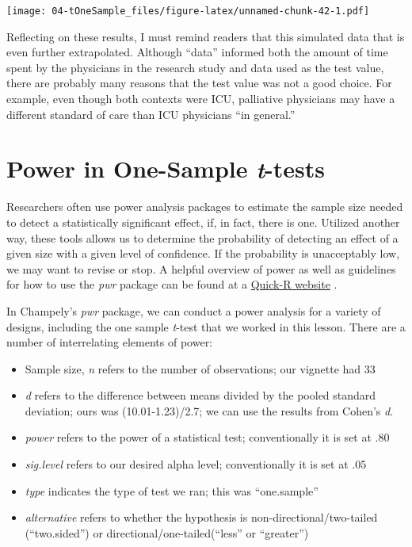 \documentclass[
  11pt,
]{book}
\providecommand{\tightlist}{%
  \setlength{\itemsep}{0pt}\setlength{\parskip}{0pt}}
\begin{document}
\texttt{[image: 04-tOneSample\_files/figure-latex/unnamed-chunk-42-1.pdf]}

Reflecting on these results, I must remind readers that this simulated data that is even further extrapolated. Although ``data'' informed both the amount of time spent by the physicians in the research study and data used as the test value, there are probably many reasons that the test value was not a good choice. For example, even though both contexts were ICU, palliative physicians may have a different standard of care than ICU physicians ``in general.''

\hypertarget{power-in-one-sample-t-tests}{%
\section{\texorpdfstring{Power in One-Sample \emph{t}-tests}{Power in One-Sample t-tests}}\label{power-in-one-sample-t-tests}}

Researchers often use power analysis packages to estimate the sample size needed to detect a statistically significant effect, if, in fact, there is one. Utilized another way, these tools allows us to determine the probability of detecting an effect of a given size with a given level of confidence. If the probability is unacceptably low, we may want to revise or stop. A helpful overview of power as well as guidelines for how to use the \emph{pwr} package can be found at a \href{https://www.statmethods.net/stats/power.html}{Quick-R website} \citep{kabacoff_power_2017}.

In Champely's \emph{pwr} package, we can conduct a power analysis for a variety of designs, including the one sample \emph{t}-test that we worked in this lesson. There are a number of interrelating elements of power:

\begin{itemize}
\tightlist
\item
  Sample size, \emph{n} refers to the number of observations; our vignette had 33
\item
  \emph{d} refers to the difference between means divided by the pooled standard deviation; ours was (10.01-1.23)/2.7; we can use the results from Cohen's \emph{d}.
\item
  \emph{power} refers to the power of a statistical test; conventionally it is set at .80
\item
  \emph{sig.level} refers to our desired alpha level; conventionally it is set at .05
\item
  \emph{type} indicates the type of test we ran; this was ``one.sample''
\item
  \emph{alternative} refers to whether the hypothesis is non-directional/two-tailed (``two.sided'') or directional/one-tailed(``less'' or ``greater'')
\end{itemize}
\end{document}

